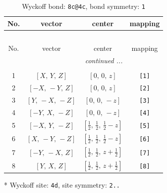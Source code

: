 \documentclass[fleqn,8pt]{jsarticle}
\begin{document}
\renewcommand{\arraystretch}{1.2}
\begin{longtable}{cccc}
\caption{Wyckoff bond: {\tt 8c@4c}, bond symmetry: {\tt 1}}
 \\
 \hline \hline
No. & vector & center & mapping \\ \hline \endfirsthead

\multicolumn{3}{l}{\tablename\ \thetable{}} \\
 \hline \hline
No. & vector & center & mapping \\ \hline \endhead

 \hline \hline
\multicolumn{3}{r}{\footnotesize\it continued ...} \\ \endfoot

 \hline \hline
\multicolumn{3}{r}{} \\ \endlastfoot

1 & $\left[ X,\, Y,\, Z \right]$ & $\left[ 0,\, 0,\, z \right]$ & {\tt [1]} \\ \hline
2 & $\left[ - X,\, - Y,\, Z \right]$ & $\left[ 0,\, 0,\, z \right]$ & {\tt [2]} \\ \hline
3 & $\left[ Y,\, - X,\, - Z \right]$ & $\left[ 0,\, 0,\, - z \right]$ & {\tt [3]} \\ \hline
4 & $\left[ - Y,\, X,\, - Z \right]$ & $\left[ 0,\, 0,\, - z \right]$ & {\tt [4]} \\ \hline
5 & $\left[ - X,\, Y,\, - Z \right]$ & $\left[ \frac{1}{2},\, \frac{1}{2},\, \frac{1}{2} - z \right]$ & {\tt [5]} \\ \hline
6 & $\left[ X,\, - Y,\, - Z \right]$ & $\left[ \frac{1}{2},\, \frac{1}{2},\, \frac{1}{2} - z \right]$ & {\tt [6]} \\ \hline
7 & $\left[ - Y,\, - X,\, Z \right]$ & $\left[ \frac{1}{2},\, \frac{1}{2},\, z + \frac{1}{2} \right]$ & {\tt [7]} \\ \hline
8 & $\left[ Y,\, X,\, Z \right]$ & $\left[ \frac{1}{2},\, \frac{1}{2},\, z + \frac{1}{2} \right]$ & {\tt [8]} \\
\end{longtable}
* Wyckoff site: {\tt 4d}, site symmetry: {\tt 2..}
\renewcommand{\arraystretch}{1.2}
\end{document}
